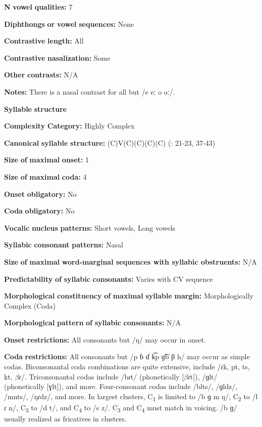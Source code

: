 \textbf{N} \textbf{vowel} \textbf{qualities:} 7

\textbf{Diphthongs} \textbf{or} \textbf{vowel} \textbf{sequences:} None

\textbf{Contrastive} \textbf{length:} All

\textbf{Contrastive} \textbf{nasalization:} Some

\textbf{Other} \textbf{contrasts:} N/A

\textbf{Notes:} There is a nasal contrast for all but /e eː o oː/.

\textbf{Syllable} \textbf{structure}

\textbf{Complexity} \textbf{Category:} Highly Complex

\textbf{Canonical} \textbf{syllable} \textbf{structure:} (C)V(C)(C)(C)(C) (\citealt{WieringWiering1994}: 21-23, 37-43)

\textbf{Size} \textbf{of} \textbf{maximal} \textbf{onset:} 1

\textbf{Size} \textbf{of} \textbf{maximal} \textbf{coda:} 4

\textbf{Onset} \textbf{obligatory:} No

\textbf{Coda} \textbf{obligatory:} No

\textbf{Vocalic} \textbf{nucleus} \textbf{patterns:} Short vowels, Long vowels

\textbf{Syllabic} \textbf{consonant} \textbf{patterns:} Nasal

\textbf{Size} \textbf{of} \textbf{maximal} \textbf{word{}-marginal sequences with syllabic obstruents:} N/A

\textbf{Predictability} \textbf{of} \textbf{syllabic} \textbf{consonants:} Varies with CV sequence

\textbf{Morphological} \textbf{constituency} \textbf{of} \textbf{maximal} \textbf{syllable} \textbf{margin:} Morphologically Complex (Coda)

\textbf{Morphological} \textbf{pattern} \textbf{of} \textbf{syllabic} \textbf{consonants:} N/A

\textbf{Onset} \textbf{restrictions:} All consonants but /ŋ/ may occur in onset.

\textbf{Coda} \textbf{restrictions:} All consonants but /p ɓ ɗ k͡p ɡ͡b β h/ may occur as simple codas. Biconsonantal coda combinations are quite extensive, include /ɾk, pt, ts, kt, $\beta ɾ$/. Triconsonantal codas include /bɾt/ (phonetically [$\beta ɾ$t]), /ɡlt/ (phonetically [ɣlt]), and more. Four-consonant codas include /blts/, /ɡldz/, /mnts/, /ŋɾdz/, and more. In largest clusters, C\textsubscript{1} is limited to /b ɡ m ŋ/, C\textsubscript{2} to /l ɾ n/, C\textsubscript{3} to /d t/, and C\textsubscript{4} to /s z/. C\textsubscript{3} and C\textsubscript{4} must match in voicing. /b ɡ/ usually realized as fricatives in clusters.

